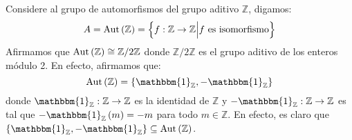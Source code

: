 \documentclass[12pt]{report}
\newcounter{it}
\theoremstyle{largebreak}
\newcommand\cf[3]{\ensuremath{#1:#2\rightarrow#3}}
\newcommand{\bbm}[1]{\ensuremath{\mathbbm{#1}}}
\newcommand{\Aut}[1]{\ensuremath{\textup{Aut}\left(#1\right)}}
\begin{document}
    \begin{sol}
        Considere al grupo de automorfismos del grupo aditivo $\mathbb{Z}$, digamos:
        \begin{equation*}
            A=\Aut{\mathbb{Z}}=\left\{\cf{f}{\mathbb{Z}}{\mathbb{Z}}\Big|f\textup{ es isomorfismo} \right\}
        \end{equation*}
        Afirmamos que $\Aut{\mathbb{Z}}\cong\mathbb{Z}/2\mathbb{Z}$ donde $\mathbb{Z}/2\mathbb{Z}$ es el grupo aditivo de los enteros módulo 2. En efecto, afirmamos que:
        \begin{equation*}
            \Aut{\mathbb{Z}}=\left\{\bbm{1}_{\mathbb{Z}},-\bbm{1}_{\mathbb{Z}}\right\}
        \end{equation*}
        donde $\cf{\bbm{1}_{\mathbb{Z}}}{\mathbb{Z}}{\mathbb{Z}}$ es la identidad de $\mathbb{Z}$ y $\cf{-\bbm{1}_{\mathbb{Z}}}{\mathbb{Z}}{\mathbb{Z}}$ es tal que $-\bbm{1}_{\mathbb{Z}}\left(m\right)=-m$ para todo $m\in\mathbb{Z}$. En efecto, es claro que $\left\{\bbm{1}_{\mathbb{Z}},-\bbm{1}_{\mathbb{Z}}\right\}\subseteq\Aut{\mathbb{Z}}$.


\end{sol}
\end{document}
